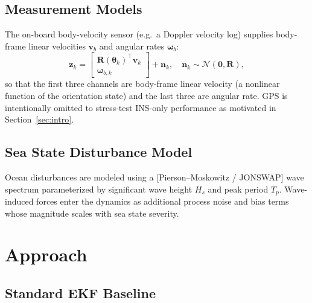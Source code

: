 \documentclass[conference]{IEEEtran}
\begin{document}
\subsection{Measurement Models}

The on-board body-velocity sensor (e.g.\ a Doppler velocity log) supplies body-frame linear velocities $\mathbf{v}_b$ and angular rates $\boldsymbol{\omega}_b$:
\begin{equation}
  \mathbf{z}_k = \begin{bmatrix} \mathbf{R}(\boldsymbol{\theta}_k)^\top \mathbf{v}_k \\ \boldsymbol{\omega}_{b,k} \end{bmatrix} + \mathbf{n}_k,
  \quad \mathbf{n}_k \sim \mathcal{N}(\mathbf{0}, \mathbf{R}),
  \label{eq:meas}
\end{equation}
so that the first three channels are body-frame linear velocity (a nonlinear function of the orientation state) and the last three are angular rate. GPS is intentionally omitted to stress-test INS-only performance as motivated in Section~\ref{sec:intro}.

\subsection{Sea State Disturbance Model}


Ocean disturbances are modeled using a [Pierson--Moskowitz / JONSWAP] wave spectrum parameterized by significant wave height $H_s$ and peak period $T_p$. Wave-induced forces enter the dynamics as additional process noise and bias terms whose magnitude scales with sea state severity.

\section{Approach}
\label{sec:approach}

\subsection{Standard EKF Baseline}
\end{document}
